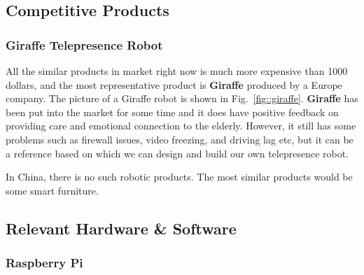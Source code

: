 \documentclass[12pt]{article}
\begin{document}
\subsection{Competitive Products}
\subsubsection{Giraffe Telepresence Robot}
All the similar products in market right now is much more expensive than 1000 dollars, and the most representative product is \textbf{Giraffe} produced by a Europe company. The picture of a Giraffe robot is shown in Fig.~\ref{fig::giraffe}.
\textbf{Giraffe} has been put into the market for some time and it does have positive feedback on providing care and emotional connection to the elderly. However, it still has some problems such as firewall issues, video freezing, and driving lag etc, but it can be a reference based on which we can design and build our own telepresence robot.
\par In China, there is no such robotic products. The most similar products would be some smart furniture.
\subsection{Relevant Hardware \& Software}
\subsubsection{Raspberry Pi}
\end{document}
